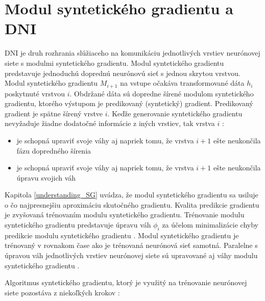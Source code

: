 \section{Modul syntetického gradientu a DNI}
\label{SGaDNI}

DNI je druh rozhrania slúžiaceho na komunikáciu jednotlivých vrstiev neurónovej siete s modulmi syntetického gradientu. Modul syntetického gradientu predstavuje jednoduchú doprednú neurónovú sieť s jednou skrytou vrstvou. Modul syntetického gradientu $M_{i+1}$ na vstupe očakáva transformované dáta $h_i$ poskytnuté vrstvou $i$. Obdržané dáta sú dopredne šírené modulom syntetického gradientu, ktorého výstupom je predikovaný (syntetický) gradient. Predikovaný gradient je spätne šírený vrstve $i$. Keďže generovanie syntetického gradientu nevyžaduje žiadne dodatočné informácie z iných vrstiev, tak vrstva $i$ \cite{Jaderberg2016}:
\begin{itemize}
\item je schopná upraviť svoje váhy aj napriek tomu, že vrstva $i+1$ ešte neukončila fázu dopredného šírenia
\item je schopná upraviť svoje váhy aj napriek tomu, že vrstva $i+1$ ešte neukončila úpravu svojich váh
\end{itemize}

Kapitola \ref{understanding_SG} uvádza, že modul syntetického gradientu sa usiluje o čo najpresnejšiu aproximáciu skutočného gradientu. Kvalita predikcie gradientu je zvyšovaná trénovaním modulu syntetického gradientu. Trénovanie modulu syntetického gradientu predstavuje úpravu váh $\phi_i$ za účelom minimalizácie chyby predikcie modulu syntetického gradientu \cite{Jaderberg2016}. Modul syntetického gradientu je trénovaný v rovnakom čase ako je trénovaná neurónová sieť samotná.  Paralelne s úpravou váh jednotlivých vrstiev neurónovej siete sú upravované aj váhy modulu syntetického gradientu \cite{Czarnecki2017}.

Algoritmus syntetického gradientu, ktorý je využitý na trénovanie neurónovej siete pozostáva z niekoľkých krokov \cite{Jaderberg2016, Czarnecki2017}:

